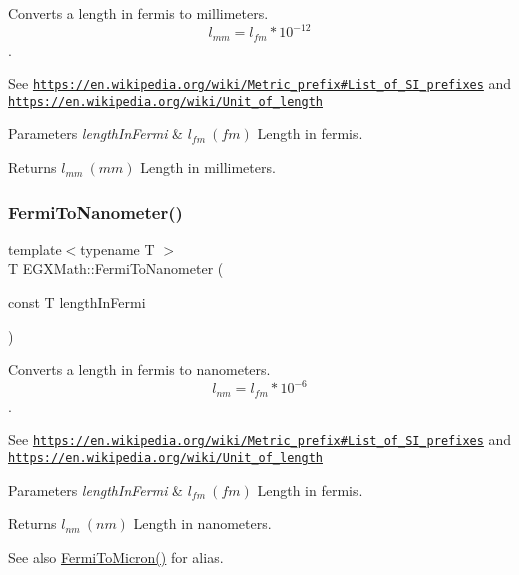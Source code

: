 Converts a length in fermis to millimeters. \[ l_{mm}=l_{fm} * 10^{-12} \]. 

See \href{https://en.wikipedia.org/wiki/Metric_prefix#List_of_SI_prefixes}{\tt https\+://en.\+wikipedia.\+org/wiki/\+Metric\+\_\+prefix\#\+List\+\_\+of\+\_\+\+S\+I\+\_\+prefixes} and \href{https://en.wikipedia.org/wiki/Unit_of_length}{\tt https\+://en.\+wikipedia.\+org/wiki/\+Unit\+\_\+of\+\_\+length} 
\begin{DoxyParams}{Parameters}
{\em length\+In\+Fermi} & $ l_{fm}\ (fm)$ Length in fermis. \\
\hline
\end{DoxyParams}
\begin{DoxyReturn}{Returns}
$ l_{mm}\ (mm)$ Length in millimeters. 
\end{DoxyReturn}
\mbox{\label{group___e_g_x_math-_conversions-_length_conversions-_non-_s_i-_fermi-_s_i_gac6be3b8925451ea542a9e5d6d780dc4c}} 
\subsubsection{\texorpdfstring{Fermi\+To\+Nanometer()}{FermiToNanometer()}}
{\footnotesize\ttfamily template$<$typename T $>$ \\
T E\+G\+X\+Math\+::\+Fermi\+To\+Nanometer (\begin{DoxyParamCaption}\item[{const T}]{length\+In\+Fermi }\end{DoxyParamCaption})}



Converts a length in fermis to nanometers. \[ l_{nm}=l_{fm} * 10^{-6} \]. 

See \href{https://en.wikipedia.org/wiki/Metric_prefix#List_of_SI_prefixes}{\tt https\+://en.\+wikipedia.\+org/wiki/\+Metric\+\_\+prefix\#\+List\+\_\+of\+\_\+\+S\+I\+\_\+prefixes} and \href{https://en.wikipedia.org/wiki/Unit_of_length}{\tt https\+://en.\+wikipedia.\+org/wiki/\+Unit\+\_\+of\+\_\+length} 
\begin{DoxyParams}{Parameters}
{\em length\+In\+Fermi} & $ l_{fm}\ (fm)$ Length in fermis. \\
\hline
\end{DoxyParams}
\begin{DoxyReturn}{Returns}
$ l_{nm}\ (nm)$ Length in nanometers. 
\end{DoxyReturn}
\begin{DoxySeeAlso}{See also}
\mbox{\hyperlink{group___e_g_x_math-_conversions-_length_conversions-_non-_s_i-_fermi-_non-_s_i_ga8a55f7fbfb5e78f8b22efaeaac18f63b}{Fermi\+To\+Micron()}} for alias. 
\end{DoxySeeAlso}
\mbox{\label{group___e_g_x_math-_conversions-_length_conversions-_non-_s_i-_fermi-_s_i_ga49b952393c3827f4bcf231331f2bbc3a}} 
